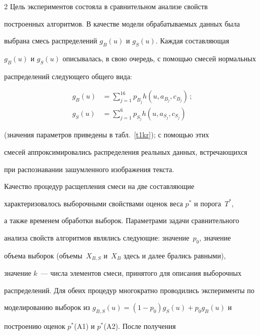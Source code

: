 \begin{multicols}{2}
Цель экспериментов состояла в сравнительном анализе свойств 


построенных алгоритмов. В качестве модели обрабатываемых данных была 


выбрана смесь распределений $g_B(u)$ и $g_S(u)$. Каждая со\-став\-ля\-ющая 


$g_B(u)$ и $g_S(u)$ описывалась, в свою очередь, с помощью смесей нормальных 


распределений следующего общего вида: 


     \begin{align*}


     g_B(u) & = \sum\limits_{j=1}^{16} p_{B_j}h\left(u,a_{B_j},c_{B_j}\right)\,;\\


     g_S(u) & = \sum\limits_{j=1}^6 p_{S_j} h\left(u, a_{S_j}, c_{S_j}\right)


     \end{align*}


     (значения параметров приведены в табл.~\ref{t1kr}); с по\-мощью этих 


смесей аппроксимировались распределения реальных данных, встречающихся 


при распознавании зашумленного изображения текста. 





     


     Качество процедур расщепления смеси на две составляющие 


характеризовалось выборочными свойствами оценок веса $p^*$ и порога~$T^*$, 


а также временем обработки выборок. Параметрами задачи сравнительного 


анализа свойств алгоритмов являлись следующие: значение~$p_0$, значение 


объема выборок (объемы~$X_{B,S}$ и~$X_B$ здесь и далее брались равными), 


значение $k$~--- числа элементов смеси, принятого для описания выборочных 


распределений. Для обеих процедур многократно проводились эксперименты по 


моделированию выборок из $g_{B,S}(u) = (1-p_0)g_S(u) +p_0g_B(u)$ и 


построению оценок $p^*$(A1) и $p^*$(A2). После получения\linebreak\vspace*{-12pt}


\pagebreak





\end{multicols}





